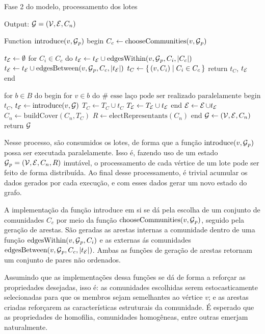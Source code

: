 \documentclass[notes.tex]{subfiles}
\begin{document}
\begin{quadro}[htbp]
\caption{Fase 2 do modelo, processamento dos lotes}
\label{qua:fase_2_2}
\begin{algorithm}
Output: $\operatorname{\mathcal{G}} = (\operatorname{\mathcal{V}}, \operatorname{\mathcal{E}}, C_n)$

Function $\text{introduce}(v, \operatorname{\mathcal{G}}_p)$
begin
    $C_c \leftarrow \text{chooseCommunities}(v, \operatorname{\mathcal{G}}_p)$

    $t_{\operatorname{\mathcal{E}}}\leftarrow \emptyset$
    for $C_i \in C_c$ do $t_{\operatorname{\mathcal{E}}}\leftarrow t_{\operatorname{\mathcal{E}}}\cup\text{edgesWithin}(v, \operatorname{\mathcal{G}}_p, C_i, |C_c|)$
    $t_{\operatorname{\mathcal{E}}}\leftarrow t_{\operatorname{\mathcal{E}}}\cup\text{edgesBetween}(v, \operatorname{\mathcal{G}}_p, C_c, |t_{\operatorname{\mathcal{E}}}|)$
    $t_C \leftarrow \set{(v, C_i) | C_i \in C_c}$
    return $t_C$,  $t_{\operatorname{\mathcal{E}}}$
end

for $b \in B$ do
begin
    for $v \in b$ do #  $\text{esse laço pode ser realizado paralelamente}$
    begin
        $t_C$, $t_{\operatorname{\mathcal{E}}}\leftarrow \text{introduce}(v, \operatorname{\mathcal{G}})$
        $T_C \leftarrow T_C \cup t_C$
        $T_{\operatorname{\mathcal{E}}}\leftarrow T_{\operatorname{\mathcal{E}}}\cup t_{\operatorname{\mathcal{E}}}$
    end
    $\operatorname{\mathcal{E}} \leftarrow \operatorname{\mathcal{E}} \cup t_{\operatorname{\mathcal{E}}}$
    $C_n \leftarrow \text{buildCover}(C_n, T_C)$
    $R \leftarrow \text{electRepresentants}(C_n)$
end
$\operatorname{\mathcal{G}} \leftarrow (\operatorname{\mathcal{V}}, \operatorname{\mathcal{E}}, C_n)$ 
return $\operatorname{\mathcal{G}}$
\end{algorithm}
\end{quadro}

Nesse processo, são consumidos os lotes, de forma que a função $\text{introduce}(v, \operatorname{\mathcal{G}}_p)$ possa ser executada paralelamente.
Isso é, fazendo uso de um estado $\operatorname{\mathcal{G}}_p = (\operatorname{\mathcal{V}}, \operatorname{\mathcal{E}}, C_n, R)$ imutável, o processamento de cada vértice de um lote pode ser feito de forma distribuída.
Ao final desse processamento, é trivial acumular os dados gerados por cada execução, e com esses dados gerar um novo estado do grafo.

A implementação da função introduce em si se dá pela escolha de um conjunto de comunidades $C_c$ por meio da função $\text{chooseCommunities}(v, \operatorname{\mathcal{G}}_p)$, seguido pela geração de arestas.
São geradas as arestas internas a comunidade dentro de uma função $\text{edgesWithin}(v, \operatorname{\mathcal{G}}_p, C_i)$ e as externas ás comunidades $\text{edgesBetween}(v, \operatorname{\mathcal{G}}_p, C_c, |t_{\operatorname{\mathcal{E}}}|)$.
Ambas as funções de geração de arestas retornam um conjunto de pares não ordenados.

Assumindo que as implementações dessa funções se dá de forma a reforçar as propriedades desejadas, isso é:
as comunidades escolhidas serem estocasticamente selecionadas para que os membros sejam semelhantes ao vértice $v$;
e as arestas criadas reforçarem as características estruturais da comunidade.
É esperado que as propriedades de homofilia, comunidades homogêneas, entre outras emerjam naturalmente.
\end{document}
